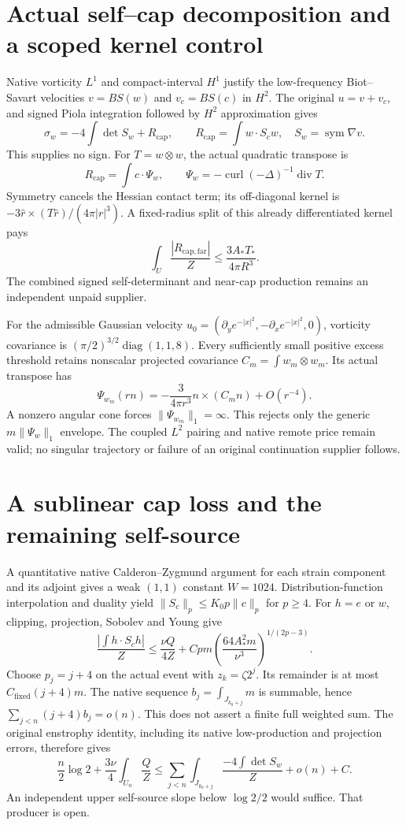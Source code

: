 \documentclass[11pt]{article}
\begin{document}
\section{Actual self--cap decomposition and a scoped kernel control}
Native vorticity $L^1$ and compact-interval $H^1$ justify the low-frequency
Biot--Savart velocities $v=BS(w)$ and $v_c=BS(c)$ in $H^2$.
The original $u=v+v_c$, and signed Piola integration followed by $H^2$
approximation gives
\[
 \sigma_w=-4\int\det S_w+R_{\mathrm{cap}},
 \qquad R_{\mathrm{cap}}=\int w\cdot S_cw,
 \quad S_w=\operatorname{sym}\nabla v.
\]
This supplies no sign. For $T=w\otimes w$, the actual quadratic transpose is
\[
 R_{\mathrm{cap}}=\int c\cdot\Psi_w,
 \qquad\Psi_w=-\operatorname{curl}(-\Delta)^{-1}\operatorname{div}T.
\]
Symmetry cancels the Hessian contact term; its off-diagonal kernel is
$-3\hat r\times(T\hat r)/(4\pi|r|^3)$. A fixed-radius split of this
already differentiated kernel pays
\[
 \int_U\frac{|R_{\mathrm{cap,far}}|}{Z}
                      \le\frac{3A_*T_*}{4\pi R^3}.
\]
The combined signed self-determinant and near-cap production remains
an independent unpaid supplier.

For the admissible Gaussian velocity
$u_0=(\partial_y e^{-|x|^2},-\partial_x e^{-|x|^2},0)$,
vorticity covariance is $(\pi/2)^{3/2}\operatorname{diag}(1,1,8)$.
Every sufficiently small positive excess threshold retains nonscalar
projected covariance $C_m=\int w_m\otimes w_m$. Its actual transpose has
\[
 \Psi_{w_m}(r n)=-\frac{3}{4\pi r^3}n\times(C_m n)+O(r^{-4}).
\]
A nonzero angular cone forces $\|\Psi_{w_m}\|_1=\infty$.
This rejects only the generic $m\|\Psi_w\|_1$ envelope. The coupled
$L^2$ pairing and native remote price remain valid; no singular trajectory
or failure of an original continuation supplier follows.

\section{A sublinear cap loss and the remaining self-source}
A quantitative native Calderon--Zygmund argument for each strain component
and its adjoint gives a weak $(1,1)$ constant $W=1024$.
Distribution-function interpolation and duality yield
$\|S_c\|_p\le K_0p\|c\|_p$ for $p\ge4$.
For $h=e$ or $w$, clipping, projection, Sobolev and Young give
\[
 \frac{|\int h\cdot S_ch|}{Z}
 \le\frac{\nu Q}{4Z}
   +C p m\left(\frac{64A_*^2m}{\nu^3}\right)^{1/(2p-3)}.
\]
Choose $p_j=j+4$ on the actual event with $z_k=\zeta2^j$.
Its remainder is at most $C_{\mathrm{fixed}}(j+4)m$.
The native sequence $b_j=\int_{J_{k_0+j}}m$ is summable, hence
$\sum_{j<n}(j+4)b_j=o(n)$. This does not assert a finite full weighted sum.
The original enstrophy identity, including its native low-production and
projection errors, therefore gives
\[
 \frac n2\log2+\frac{3\nu}{4}\int_{U_n}\frac QZ
 \le\sum_{j<n}\int_{J_{k_0+j}}\frac{-4\int\det S_w}{Z}+o(n)+C.
\]
An independent upper self-source slope below $\log2/2$ would suffice.
That producer is open.
\end{document}
